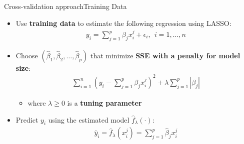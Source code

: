 \documentclass[dvipsnames,hyperref={pdfpagelabels=false}]{beamer}
\begin{document}
\begin{frame}{Cross-validation approach}{Training Data}
    \begin{itemize}
        \item Use \textbf{training data} to estimate the following 
        regression using LASSO:
        \begin{eqnarray*}
            y_{i} = \sum^{p}_{j=1} \beta_{j} x^{j}_{i} + \epsilon_{i}, 
            \ \ i=1, \ldots, n
        \end{eqnarray*}
        \vspace{0.1cm}
        \item Choose $(\hat{\beta}_{1}, \hat{\beta}_{2}, \ldots, \hat{\beta}_{p})$ 
        that minimize \textbf{SSE with a penalty for model size}:
        \begin{eqnarray*}
            \sum^{n}_{i=1} \left(y_{i} - \sum^{p}_{j=1} \beta_{j} 
            x^{j}_{i}\right)^{2} + \lambda \sum^{p}_{j=1} |\beta_{j}|
        \end{eqnarray*}
        \begin{itemize}
            \item where $\lambda \geq 0$ is a \textbf{tuning parameter}
        \end{itemize}
        \vspace{0.2cm}
        \item Predict $y_{i}$ using the estimated model 
        $\hat{f}_{\lambda}(\cdot)$:
        \begin{eqnarray*}
            \hat{y}_{i} = \hat{f}_{\lambda}(x^{j}_{i}) 
            = \sum^{p}_{j=1} \hat{\beta}_{j} x^{j}_{i}
        \end{eqnarray*}
    \end{itemize}
\end{frame}



		
		
\end{document}
